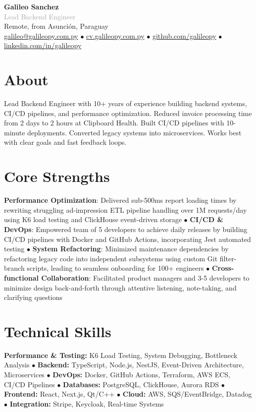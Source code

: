 \documentclass[10pt,a4paper]{article}
\newcommand{\cvheader}[5]{
  \begin{center}
    {\Large \textbf{#1}}\\[0.1em]
    {\normalsize \textcolor{darkgray}{#2}}\\[0.3em]
    
    \footnotesize \textcolor{mediumgray}{#3}\\[0.2em]
    
    \footnotesize
    \href{mailto:#4}{#4} $\bullet$ \href{https://#5}{#5} $\bullet$ 
    \href{https://github.com/galileopy}{github.com/galileopy} $\bullet$ 
    \href{https://www.linkedin.com/in/galileopy}{linkedin.com/in/galileopy}
  \end{center}
  \vspace{0.3em}
}
\begin{document}
\cvheader{Galileo Sanchez}{Lead Backend Engineer}{Remote, from Asunción, Paraguay}{galileo@galileopy.com.py}{cv.galileopy.com.py}

\section{About}
{\footnotesize Lead Backend Engineer with 10+ years of experience building backend systems, CI/CD pipelines, and performance optimization. Reduced invoice processing time from 2 days to 2 hours at Clipboard Health. Built CI/CD pipelines with 10-minute deployments. Converted legacy systems into microservices. Works best with clear goals and fast feedback loops.}

\section{Core Strengths}
{\footnotesize
	\textbf{Performance Optimization}: Delivered sub-500ms report loading times by rewriting struggling ad-impression ETL pipeline handling over 1M requests/day using K6 load testing and ClickHouse event-driven storage $\bullet$ \textbf{CI/CD \& DevOps}: Empowered team of 5 developers to achieve daily releases by building CI/CD pipelines with Docker and GitHub Actions, incorporating Jest automated testing $\bullet$ \textbf{System Refactoring}: Minimized maintenance dependencies by refactoring legacy code into independent subsystems using custom Git filter-branch scripts, leading to seamless onboarding for 100+ engineers $\bullet$ \textbf{Cross-functional Collaboration}: Facilitated product managers and 3-5 developers to minimize design back-and-forth through attentive listening, note-taking, and clarifying questions
}

\section{Technical Skills}
{\footnotesize
	\textbf{Performance \& Testing:} K6 Load Testing, System Debugging, Bottleneck Analysis $\bullet$ \textbf{Backend:} TypeScript, Node.js, NestJS, Event-Driven Architecture, Microservices $\bullet$ \textbf{DevOps:} Docker, GitHub Actions, Terraform, AWS ECS, CI/CD Pipelines $\bullet$ \textbf{Databases:} PostgreSQL, ClickHouse, Aurora RDS $\bullet$ \textbf{Frontend:} React, Next.js, Qt/C++ $\bullet$ \textbf{Cloud:} AWS, SQS/EventBridge, Datadog $\bullet$ \textbf{Integration:} Stripe, Keycloak, Real-time Systems
}
\end{document}
